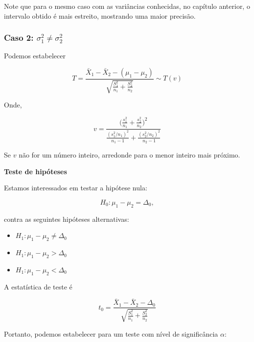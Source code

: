 \documentclass[
]{book}
\providecommand{\tightlist}{%
  \setlength{\itemsep}{0pt}\setlength{\parskip}{0pt}}
\begin{document}
Note que para o mesmo caso com as variâncias conhecidas, no capítulo anterior, o intervalo obtido é mais estreito, mostrando uma maior precisão.

\hypertarget{caso-2-sigma2_1nesigma2_2}{%
\subsubsection{\texorpdfstring{Caso 2: \(\sigma^2_1\ne\sigma^2_2\)}{Caso 2: \textbackslash sigma\^{}2\_1\textbackslash ne\textbackslash sigma\^{}2\_2}}\label{caso-2-sigma2_1nesigma2_2}}

Podemos estabelecer

\[T=\frac{\bar X_1-\bar X_2-(\mu_1-\mu_2)}{\sqrt{\frac{S^2_1}{n_1}+\frac{S^2_2}{n_2}}}\sim T(v)\]

Onde,

\[v=\frac{\Big(\frac{s_1^2}{n_1}+\frac{s_2^2}{n_2}\Big)^2}{\frac{(s_1^2/n_1)^2}{n_1-1}+\frac{(s_2^2/n_2)^2}{n_2-1}}\]

Se \(v\) não for um número inteiro, arredonde para o menor inteiro mais próximo.

\textbf{Teste de hipóteses}

Estamos interessados em testar a hipótese nula:

\[H_0: \mu_1-\mu_2=\Delta_0,\]

contra as seguintes hipóteses alternativas:

\begin{itemize}
\tightlist
\item
  \(H_1: \mu_1-\mu_2 \ne \Delta_0\)
\item
  \(H_1: \mu_1-\mu_2 > \Delta_0\)
\item
  \(H_1: \mu_1-\mu_2 < \Delta_0\)
\end{itemize}

A estatística de teste é

\[t_0=\frac{\bar X_1-\bar X_2-\Delta_0}{\sqrt{\frac{S^2_1}{n_1}+\frac{S^2_2}{n_2}}}\]

Portanto, podemos estabelecer para um teste com nível de significância \(\alpha\):
\end{document}
